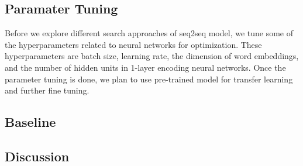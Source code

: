 \documentclass[11pt,a4paper]{article}
\begin{document}
\subsection{Paramater Tuning} \label{ssec:paratune}
Before we explore different search approaches of seq2seq model, we tune some of the hyperparameters related to neural networks for optimization. These hyperparameters are batch size, learning rate, the dimension of word embeddings, and the number of hidden units in 1-layer encoding neural networks. Once the parameter tuning is done, we plan to use pre-trained model for transfer learning and further fine tuning.

\subsection{Baseline} \label{ssec:baseline}

\subsection{Discussion} \label{ssec:discussion}%



\end{document}
